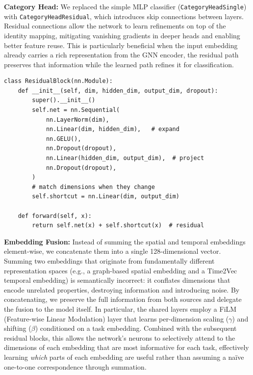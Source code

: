\documentclass[conference]{IEEEtran}
\begin{document}
\textbf{Category Head:} We replaced the simple MLP classifier (\texttt{CategoryHeadSingle}) with \texttt{CategoryHeadResidual}, which introduces skip connections between layers. Residual connections allow the network to learn refinements on top of the identity mapping, mitigating vanishing gradients in deeper heads and enabling better feature reuse. This is particularly beneficial when the input embedding already carries a rich representation from the GNN encoder, the residual path preserves that information while the learned path refines it for classification.
\newpage
\begin{lstlisting}[caption={ResidualBlock: skip connection preserves the original signal.}]
class ResidualBlock(nn.Module):
    def __init__(self, dim, hidden_dim, output_dim, dropout):
        super().__init__()
        self.net = nn.Sequential(
            nn.LayerNorm(dim),
            nn.Linear(dim, hidden_dim),   # expand
            nn.GELU(),
            nn.Dropout(dropout),
            nn.Linear(hidden_dim, output_dim),  # project
            nn.Dropout(dropout),
        )
        # match dimensions when they change
        self.shortcut = nn.Linear(dim, output_dim)

    def forward(self, x):
        return self.net(x) + self.shortcut(x)  # residual
\end{lstlisting}

\textbf{Embedding Fusion:} Instead of summing the spatial and temporal embeddings element-wise, we concatenate them into a single 128-dimensional vector. Summing two embeddings that originate from fundamentally different representation spaces (e.g., a graph-based spatial embedding and a Time2Vec temporal embedding) is semantically incorrect: it conflates dimensions that encode unrelated properties, destroying information and introducing noise. By concatenating, we preserve the full information from both sources and delegate the fusion to the model itself. In particular, the shared layers employ a FiLM (Feature-wise Linear Modulation) layer that learns per-dimension scaling ($\gamma$) and shifting ($\beta$) conditioned on a task embedding. Combined with the subsequent residual blocks, this allows the network's neurons to selectively attend to the dimensions of each embedding that are most informative for each task, effectively learning \emph{which} parts of each embedding are useful rather than assuming a na\"{i}ve one-to-one correspondence through summation.
\end{document}
